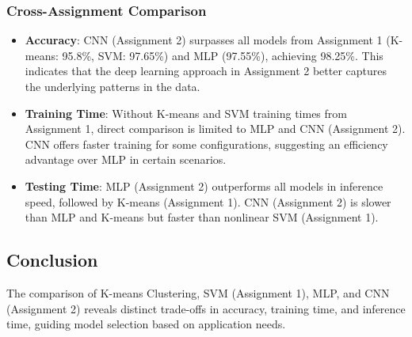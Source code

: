 \documentclass[a4paper,12pt]{article}
\begin{document}
\subsubsection{Cross-Assignment Comparison}
\begin{itemize}
    \item \textbf{Accuracy}: CNN (Assignment 2) surpasses all models from Assignment 1 (K-means: 95.8\%, SVM: 97.65\%) and MLP (97.55\%), achieving 98.25\%. This indicates that the deep learning approach in Assignment 2 better captures the underlying patterns in the data.
    \item \textbf{Training Time}: Without K-means and SVM training times from Assignment 1, direct comparison is limited to MLP and CNN (Assignment 2). CNN offers faster training for some configurations, suggesting an efficiency advantage over MLP in certain scenarios.
    \item \textbf{Testing Time}: MLP (Assignment 2) outperforms all models in inference speed, followed by K-means (Assignment 1). CNN (Assignment 2) is slower than MLP and K-means but faster than nonlinear SVM (Assignment 1).\\
\end{itemize}

\subsection{Conclusion}
The comparison of K-means Clustering, SVM (Assignment 1), MLP, and CNN (Assignment 2) reveals distinct trade-offs in accuracy, training time, and inference time, guiding model selection based on application needs.
\end{document}

